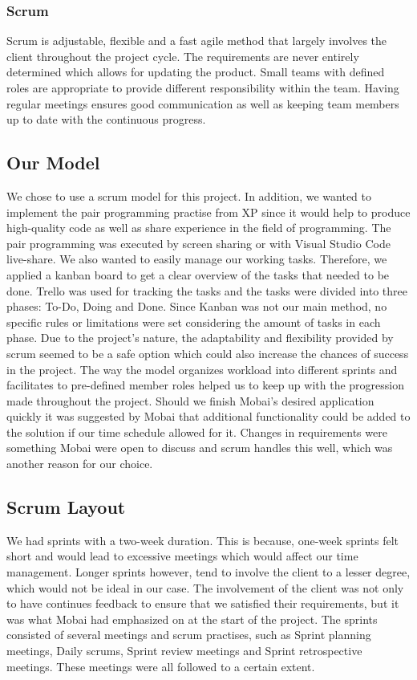 \subsubsection*{Scrum}
Scrum is adjustable, flexible and a fast agile method that largely involves the client throughout the project cycle\cite{ScrumDefinition}. The requirements are never entirely determined which allows for updating the product. Small teams with defined roles are appropriate to provide different responsibility within the team. Having regular meetings ensures good communication as well as keeping team members up to date with the continuous progress.    

\subsection{Our Model}
\label{sec:OurModel}
We chose to use a scrum model for this project. In addition, we wanted to implement the pair programming practise from XP since it would help to produce high-quality code as well as share experience in the field of programming. The pair programming was executed by screen sharing or with Visual Studio Code live-share. We also wanted to easily manage our working tasks. Therefore, we applied a kanban board to get a clear overview of the tasks that needed to be done. Trello \cite{Trello} was used for tracking the tasks and the tasks were divided into three phases: To-Do, Doing and Done. Since Kanban was not our main method, no specific rules or limitations were set considering the amount of tasks in each phase. Due to the project's nature, the adaptability and flexibility provided by scrum seemed to be a safe option which could also increase the chances of success in the project. The way the model organizes workload into different sprints and facilitates to pre-defined member roles helped us to keep up with the progression made throughout the project. Should we finish Mobai's desired application quickly it was suggested by Mobai that additional functionality could be added to the solution if our time schedule allowed for it. Changes in requirements were something Mobai were open to discuss and scrum handles this well, which was another reason for our choice. 

\subsection{Scrum Layout}
We had sprints with a two-week duration. This is because, one-week sprints felt short and would lead to excessive meetings which would affect our time management. Longer sprints however, tend to involve the client to a lesser degree, which would not be ideal in our case. The involvement of the client was not only to have continues feedback to ensure that we satisfied their requirements, but it was what Mobai had emphasized on at the start of the project. The sprints consisted of several meetings and scrum practises, such as Sprint planning meetings, Daily scrums, Sprint review meetings and Sprint retrospective meetings. These meetings were all followed to a certain extent. 

